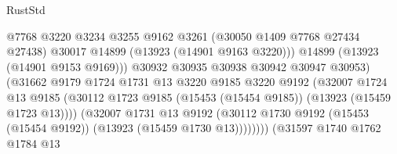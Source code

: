 \begin{lexlean}{RustStd}
\begin{coremodule}
                                              @7768
                                              @3220
                                              @3234
                                              @3255
                                              @9162
                                              @3261
                                              (@30050 @1409 @7768 @27434 @27438)
                                              @30017
                                              @14899
                                              (@13923 (@14901 @9163 @3220)))
                                            @14899
                                            (@13923 (@14901 @9153 @9169)))
                                          @30932
                                          @30935
                                          @30938
                                          @30942
                                          @30947
                                          @30953)
                                        (@31662
                                          @9179
                                          @1724
                                          @1731
                                          @13
                                          @3220
                                          @9185
                                          @3220
                                          @9192
                                          (@32007
                                            @1724
                                            @13
                                            @9185
                                            (@30112
                                              @1723
                                              @9185
                                              (@15453 (@15454 @9185))
                                              (@13923 (@15459 @1723 @13))))
                                          (@32007
                                            @1731
                                            @13
                                            @9192
                                            (@30112
                                              @1730
                                              @9192
                                              (@15453 (@15454 @9192))
                                              (@13923 (@15459 @1730 @13))))))))
                                  (@31597
                                    @1740
                                    @1762
                                    @1784
                                    @13

\end{coremodule}
\end{lexlean}

